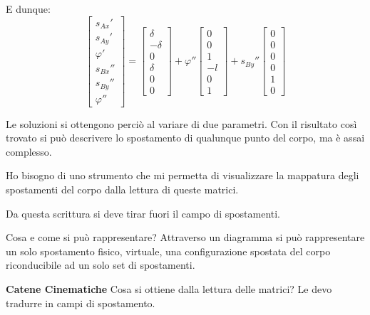 \documentclass{article}
\begin{document}
\begin{adjustwidth}{2in}{}
 E dunque: 
 \[ 
 \left[ \begin{array}{c}
 	s_{Ax}' \\
 	s_{Ay}' \\
 	\varphi' \\
 	s_{Bx}'' \\
 	s_{By}'' \\
 	\varphi''
 \end{array}\right] = \left[\begin{array}{c}
 \delta \\
 -\delta \\
 0 \\
 \delta \\
 0 \\
 0
\end{array} \right] + \varphi'' \left[\begin{array}{c}
0 \\
0 \\
1 \\
-l \\
0 \\
1 
\end{array} \right] + s_{By}'' \left[\begin{array}{c}
0 \\
0 \\
0 \\
0 \\
1 \\
0 
\end{array} \right] 
\] 

Le soluzioni si ottengono perciò al variare di due parametri. Con il risultato così trovato si può descrivere lo spostamento di qualunque punto del corpo, ma è assai complesso.  \newline

Ho bisogno di uno strumento che mi permetta di visualizzare la mappatura degli spostamenti del corpo dalla lettura di queste matrici.

Da questa scrittura si deve tirar fuori il campo di spostamenti.

Cosa e come si può rappresentare? Attraverso un diagramma si può rappresentare un solo spostamento fisico, virtuale, una configurazione spostata del corpo riconducibile ad un solo set di spostamenti. \newline 

{\Large \textbf{Catene Cinematiche}} \mbox{} \newline		
Cosa si ottiene dalla lettura delle matrici? Le devo tradurre in campi di spostamento. 


\end{adjustwidth}
\end{document}

